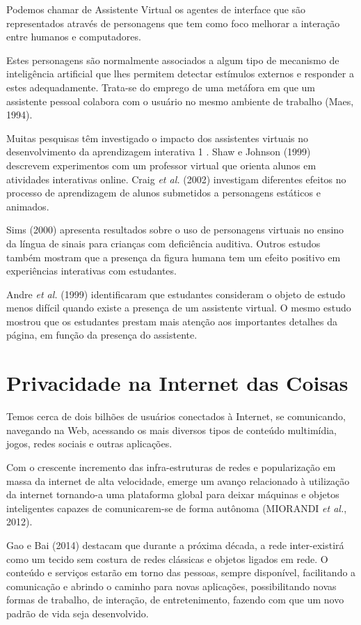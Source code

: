 Podemos chamar de Assistente Virtual os agentes de interface que são representados através de personagens que tem como foco melhorar a interação entre humanos e computadores.

Estes personagens são normalmente associados a algum tipo de mecanismo de inteligência artificial que lhes permitem detectar estímulos externos e responder a estes adequadamente. Trata-se do emprego de uma metáfora em que um assistente pessoal colabora com o usuário no mesmo ambiente de trabalho (Maes, 1994).

Muitas pesquisas têm investigado o impacto dos assistentes virtuais no desenvolvimento da aprendizagem interativa 1 . Shaw e Johnson (1999) descrevem experimentos com um professor virtual que orienta alunos em atividades interativas online. Craig \textit{et al.} (2002) investigam diferentes efeitos no processo de aprendizagem de alunos submetidos a personagens estáticos e animados.

Sims (2000) apresenta resultados sobre o uso de personagens virtuais no ensino da língua de sinais para crianças com deficiência auditiva. Outros estudos também mostram que a presença da figura humana tem um efeito positivo em experiências interativas com estudantes.

Andre \textit{et al.} (1999) identificaram que estudantes consideram o objeto de estudo menos difícil quando existe a presença de um assistente virtual. O mesmo estudo mostrou que os estudantes prestam mais atenção aos importantes detalhes da página, em função da presença do assistente.

\section{Privacidade na Internet das Coisas} \label{s:privacidade_na_internet_das_coisas}

Temos cerca de dois bilhões de usuários conectados à Internet, se comunicando, navegando na Web, acessando os mais diversos tipos de conteúdo multimídia, jogos, redes sociais e outras aplicações.

Com o crescente incremento das infra-estruturas de redes e popularização em massa da internet de alta velocidade, emerge um avanço relacionado à utilização da internet tornando-a uma plataforma global para deixar máquinas e objetos inteligentes capazes de comunicarem-se de forma autônoma (MIORANDI \textit{et al.}, 2012).

Gao e Bai (2014) destacam que durante a próxima década, a rede inter-existirá como um tecido sem costura de redes clássicas e objetos ligados em rede. O conteúdo e serviços estarão em torno das pessoas, sempre disponível, facilitando a comunicação e abrindo o caminho para novas aplicações, possibilitando novas formas de trabalho, de interação, de entretenimento, fazendo com que um novo padrão de vida seja desenvolvido.

